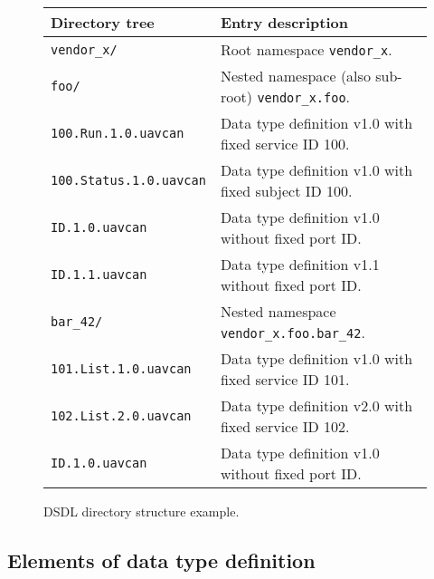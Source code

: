 \begin{figure}[H]
    \begin{tabu}{|l|X|} \hline
        \rowfont{\bfseries}
        Directory tree & Entry description \\\hline

        \texttt{vendor\_x/} &
        Root namespace \texttt{vendor\_x}. \\

        \texttt{\qquad{}foo/} &
        Nested namespace (also sub-root) \texttt{vendor\_x.foo}. \\

        \texttt{\qquad{}\qquad{}100.Run.1.0.uavcan} &
        Data type definition v1.0 with fixed service ID 100. \\

        \texttt{\qquad{}\qquad{}100.Status.1.0.uavcan} &
        Data type definition v1.0 with fixed subject ID 100. \\

        \texttt{\qquad{}\qquad{}ID.1.0.uavcan} &
        Data type definition v1.0 without fixed port ID. \\

        \texttt{\qquad{}\qquad{}ID.1.1.uavcan} &
        Data type definition v1.1 without fixed port ID. \\

        \texttt{\qquad{}\qquad{}bar\_42/} &
        Nested namespace \texttt{vendor\_x.foo.bar\_42}. \\

        \texttt{\qquad{}\qquad{}\qquad{}101.List.1.0.uavcan} &
        Data type definition v1.0 with fixed service ID 101. \\

        \texttt{\qquad{}\qquad{}\qquad{}102.List.2.0.uavcan} &
        Data type definition v2.0 with fixed service ID 102. \\

        \texttt{\qquad{}\qquad{}\qquad{}ID.1.0.uavcan} &
        Data type definition v1.0 without fixed port ID. \\\hline
    \end{tabu}
    \caption{DSDL directory structure example.}\label{fig:dsdl_directory_structure_example}
\end{figure}

\subsection{Elements of data type definition}

